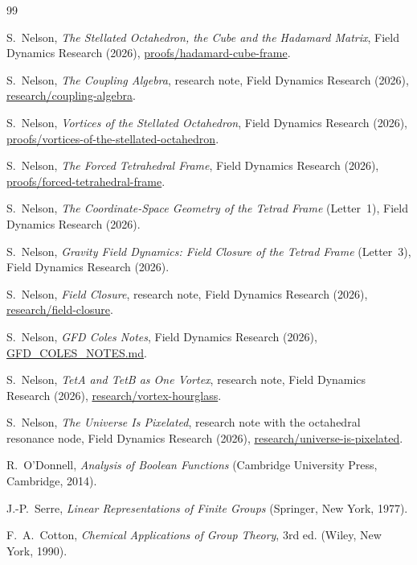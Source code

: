 \documentclass[twocolumn]{iopjournal}
\theoremstyle{definition}
\theoremstyle{remark}
\begin{document}
\begin{thebibliography}{99}

S.~Nelson,
\textit{The Stellated Octahedron, the Cube and the Hadamard Matrix},
Field Dynamics Research (2026),
\url{proofs/hadamard-cube-frame}.

S.~Nelson,
\textit{The Coupling Algebra}, research note, Field Dynamics Research
(2026), \url{research/coupling-algebra}.

S.~Nelson,
\textit{Vortices of the Stellated Octahedron},
Field Dynamics Research (2026),
\url{proofs/vortices-of-the-stellated-octahedron}.

S.~Nelson,
\textit{The Forced Tetrahedral Frame},
Field Dynamics Research (2026),
\url{proofs/forced-tetrahedral-frame}.

S.~Nelson,
\textit{The Coordinate-Space Geometry of the Tetrad Frame} (Letter~1),
Field Dynamics Research (2026).

S.~Nelson,
\textit{Gravity Field Dynamics: Field Closure of the Tetrad Frame}
(Letter~3), Field Dynamics Research (2026).

S.~Nelson,
\textit{Field Closure}, research note, Field Dynamics Research (2026),
\url{research/field-closure}.

S.~Nelson,
\textit{GFD Coles Notes}, Field Dynamics Research (2026),
\url{GFD_COLES_NOTES.md}.

S.~Nelson,
\textit{TetA and TetB as One Vortex}, research note, Field Dynamics
Research (2026), \url{research/vortex-hourglass}.

S.~Nelson,
\textit{The Universe Is Pixelated}, research note with the octahedral
resonance node, Field Dynamics Research (2026),
\url{research/universe-is-pixelated}.

R.~O'Donnell,
\textit{Analysis of Boolean Functions}
(Cambridge University Press, Cambridge, 2014).

J.-P.~Serre,
\textit{Linear Representations of Finite Groups}
(Springer, New York, 1977).

F.~A.~Cotton,
\textit{Chemical Applications of Group Theory}, 3rd ed.
(Wiley, New York, 1990).

\end{thebibliography}
\end{document}
